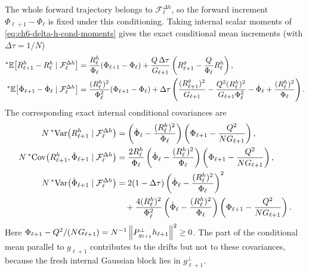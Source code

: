 The whole forward trajectory belongs to $\mathcal{F}_\ell^{\Delta h}$, so the forward increment $\Phi_{\ell+1} - \Phi_\ell$ is fixed under this conditioning. Taking internal scalar moments of \eqref{eq:ch6-delta-h-cond-moments} gives the exact conditional mean increments (with $\Delta\tau = 1/N$)
\begin{equation}
\label{eq:ch6-overlap-exact-drifts}
\begin{aligned}
{}^*\mathbb{E}\bigl[R_{\ell+1}^h - R_\ell^h \mid \mathcal{F}_\ell^{\Delta h}\bigr]
&= \frac{R_\ell^h}{\Phi_\ell}(\Phi_{\ell+1} - \Phi_\ell) + \frac{Q\,\Delta\tau}{G_{\ell+1}}\left(R_{\ell+1}^g - \frac{Q}{\Phi_\ell} R_\ell^h\right), \\
{}^*\mathbb{E}\bigl[\dot{\Phi}_{\ell+1} - \dot{\Phi}_\ell \mid \mathcal{F}_\ell^{\Delta h}\bigr]
&= \frac{(R_\ell^h)^2}{\Phi_\ell^2}(\Phi_{\ell+1} - \Phi_\ell)
   + \Delta\tau\left(\frac{(R_{\ell+1}^g)^2}{G_{\ell+1}} - \frac{Q^2 (R_\ell^h)^2}{G_{\ell+1}\Phi_\ell^2} - \dot{\Phi}_\ell + \frac{(R_\ell^h)^2}{\Phi_\ell}\right).
\end{aligned}
\end{equation}
The corresponding exact internal conditional covariances are
\begin{equation}
\label{eq:ch6-overlap-exact-covs}
\begin{aligned}
N\,{}^*\!\operatorname{Var}\bigl(R_{\ell+1}^h \mid \mathcal{F}_\ell^{\Delta h}\bigr)
&= \left(\dot{\Phi}_\ell - \frac{(R_\ell^h)^2}{\Phi_\ell}\right)\left(\Phi_{\ell+1} - \frac{Q^2}{N G_{\ell+1}}\right), \\
N\,{}^*\!\operatorname{Cov}\bigl(R_{\ell+1}^h, \dot{\Phi}_{\ell+1} \mid \mathcal{F}_\ell^{\Delta h}\bigr)
&= \frac{2 R_\ell^h}{\Phi_\ell}\left(\dot{\Phi}_\ell - \frac{(R_\ell^h)^2}{\Phi_\ell}\right)\left(\Phi_{\ell+1} - \frac{Q^2}{N G_{\ell+1}}\right), \\
N\,{}^*\!\operatorname{Var}\bigl(\dot{\Phi}_{\ell+1} \mid \mathcal{F}_\ell^{\Delta h}\bigr)
&= 2(1 - \Delta\tau)\left(\dot{\Phi}_\ell - \frac{(R_\ell^h)^2}{\Phi_\ell}\right)^2 \\
&\quad + \frac{4(R_\ell^h)^2}{\Phi_\ell^2}\left(\dot{\Phi}_\ell - \frac{(R_\ell^h)^2}{\Phi_\ell}\right)\left(\Phi_{\ell+1} - \frac{Q^2}{N G_{\ell+1}}\right).
\end{aligned}
\end{equation}
Here $\Phi_{\ell+1} - Q^2/(N G_{\ell+1}) = N^{-1}\left\lVert P_{g_{\ell+1}}^\perp h_{\ell+1} \right\rVert^2 \ge 0$. The part of the conditional mean parallel to $g_{\ell+1}$ contributes to the drifts but not to these covariances, because the fresh internal Gaussian block lies in $g_{\ell+1}^\perp$.

